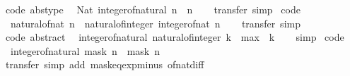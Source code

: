 \begin{isabellebody}
\ {\isacharbrackleft}{\kern0pt}code\ abstype{\isacharbrackright}{\kern0pt}{\isacharcolon}{\kern0pt}\isanewline
\ \ {\isachardoublequoteopen}Nat\ {\isacharparenleft}{\kern0pt}integer{\isacharunderscore}{\kern0pt}of{\isacharunderscore}{\kern0pt}natural\ n{\isacharparenright}{\kern0pt}\ {\isacharequal}{\kern0pt}\ n{\isachardoublequoteclose}\isanewline
%
\isadelimproof
\ \ %
\endisadelimproof
%
\isatagproof
{}\isamarkupfalse%
\ transfer\ simp%
\endisatagproof
{\isafoldproof}%
%
\isadelimproof
\isanewline
%
\endisadelimproof
\isanewline
{}\isamarkupfalse%
\ {\isacharbrackleft}{\kern0pt}code{\isacharbrackright}{\kern0pt}{\isacharcolon}{\kern0pt}\isanewline
\ \ {\isachardoublequoteopen}natural{\isacharunderscore}{\kern0pt}of{\isacharunderscore}{\kern0pt}nat\ n\ {\isacharequal}{\kern0pt}\ natural{\isacharunderscore}{\kern0pt}of{\isacharunderscore}{\kern0pt}integer\ {\isacharparenleft}{\kern0pt}integer{\isacharunderscore}{\kern0pt}of{\isacharunderscore}{\kern0pt}nat\ n{\isacharparenright}{\kern0pt}{\isachardoublequoteclose}\isanewline
%
\isadelimproof
\ \ %
\endisadelimproof
%
\isatagproof
{}\isamarkupfalse%
\ transfer\ simp%
\endisatagproof
{\isafoldproof}%
%
\isadelimproof
\isanewline
%
\endisadelimproof
\isanewline
{}\isamarkupfalse%
\ {\isacharbrackleft}{\kern0pt}code\ abstract{\isacharbrackright}{\kern0pt}{\isacharcolon}{\kern0pt}\isanewline
\ \ {\isachardoublequoteopen}integer{\isacharunderscore}{\kern0pt}of{\isacharunderscore}{\kern0pt}natural\ {\isacharparenleft}{\kern0pt}natural{\isacharunderscore}{\kern0pt}of{\isacharunderscore}{\kern0pt}integer\ k{\isacharparenright}{\kern0pt}\ {\isacharequal}{\kern0pt}\ max\ {}\ k{\isachardoublequoteclose}\isanewline
%
\isadelimproof
\ \ %
\endisadelimproof
%
\isatagproof
{}\isamarkupfalse%
\ simp%
\endisatagproof
{\isafoldproof}%
%
\isadelimproof
\isanewline
%
\endisadelimproof
\isanewline
{}\isamarkupfalse%
\ {\isacharbrackleft}{\kern0pt}code{\isacharbrackright}{\kern0pt}{\isacharcolon}{\kern0pt}\isanewline
\ \ {\isacartoucheopen}integer{\isacharunderscore}{\kern0pt}of{\isacharunderscore}{\kern0pt}natural\ {\isacharparenleft}{\kern0pt}mask\ n{\isacharparenright}{\kern0pt}\ {\isacharequal}{\kern0pt}\ mask\ n{\isacartoucheclose}\isanewline
%
\isadelimproof
\ \ %
\endisadelimproof
%
\isatagproof
{}\isamarkupfalse%
\ transfer\ {\isacharparenleft}{\kern0pt}simp\ add{\isacharcolon}{\kern0pt}\ mask{\isacharunderscore}{\kern0pt}eq{\isacharunderscore}{\kern0pt}exp{\isacharunderscore}{\kern0pt}minus{\isacharunderscore}{\kern0pt}{}\ of{\isacharunderscore}{\kern0pt}nat{\isacharunderscore}{\kern0pt}diff{\isacharparenright}{\kern0pt}%

\end{isabellebody}
